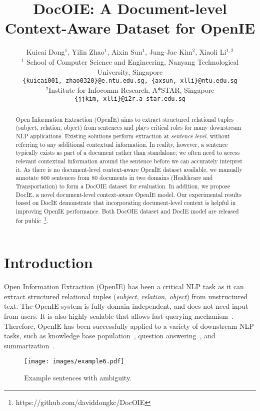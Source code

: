 \documentclass[11pt,a4paper]{article}
\title{DocOIE: A Document-level Context-Aware Dataset for OpenIE}
\author{Kuicai Dong$^1$, Yilin Zhao$^1$, Aixin Sun$^1$, Jung-Jae Kim$^2$, Xiaoli Li$^{1,2}$ \\
$^1$
School of Computer Science and Engineering, Nanyang Technological University, Singapore\\
\texttt{\{kuicai001, zhao0320\}@e.ntu.edu.sg, \{axsun, xlli\}@ntu.edu.sg}\\
$^2$Institute for Infocomm Research, A*STAR, Singapore\\
\texttt{\{jjkim, xlli\}@i2r.a-star.edu.sg}}
\date{}
\begin{document}
\maketitle

\begin{abstract}
Open Information Extraction (OpenIE) aims to extract structured relational tuples (subject, relation, object) from sentences and plays critical roles for many downstream NLP applications. Existing solutions perform extraction at \textit{sentence level}, without referring to any additional contextual information. In reality, however, a sentence typically exists as part of a document rather than standalone; we often need to access relevant contextual information around the sentence before we can accurately interpret it.
As there is no document-level context-aware OpenIE dataset available, we manually annotate 800 sentences from 80 documents in two domains (Healthcare and Transportation) to form a DocOIE dataset for evaluation.
In addition, we propose DocIE, a novel document-level context-aware OpenIE model. Our experimental results based on DocIE demonstrate that incorporating document-level context is helpful in improving OpenIE performance. Both DocOIE dataset and DocIE model are released for public~\footnote{https://github.com/daviddongkc/DocOIE}.

\end{abstract}




\section{Introduction}
\label{sec:intro}


Open Information Extraction (OpenIE) has been a critical NLP task as it can extract structured relational tuples (\textit{subject, relation, object}) from unstructured text. The OpenIE system is fully domain-independent, and does not need input from users. It is also highly scalable that allows fast querying mechanism~\cite{yates2007textrunner}. Therefore, OpenIE has been successfully applied to a variety of downstream NLP tasks, such as knowledge base population~\cite{martinez2018openie, gashteovski2020aligning}, question answering~\cite{khot2017answering}, and summarization~\cite{fan2019using}.

\begin{figure}[th]
    \centering
    \texttt{[image: images/example6.pdf]}
    \vspace{-0.5em}
    \caption{Example sentences with ambiguity.}
    \vspace{-0.5em}
    \label{fig:example}
\end{figure}
\end{document}
